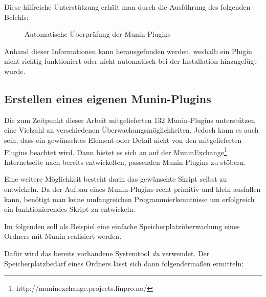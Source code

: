 Diese hilfreiche Unterstützung erhält man durch die Ausführung des folgenden Befehls:

\begin{figure}[ht]
	\centering
		\caption{Automatische Überprüfung der Munin-Plugins}
		\label{suggest}
\end{figure}

Anhand dieser Informationen kann herausgefunden werden, weshalb ein Plugin nicht richtig funktioniert oder nicht automatisch bei der Installation hinzugefügt wurde.
\newpage
\subsection{Erstellen eines eigenen Munin-Plugins}

Die zum Zeitpunkt dieser Arbeit mitgelieferten 132 Munin-Plugins unterstützen eine Vielzahl an verschiedenen Überwachungsmöglichkeiten.
Jedoch kann es auch sein, dass ein gewünschtes Element oder Detail nicht von den mitgelieferten Plugins beachtet wird.
Dann bietet es sich an auf der MuninExchange\footnote{http://muninexchange.projects.linpro.no/} Internetseite nach bereits entwickelten, passenden Munin-Plugins zu stöbern.

Eine weitere Möglichkeit besteht darin das gewünschte Skript selbst zu entwickeln.
Da der Aufbau eines Munin-Plugins recht primitiv und klein ausfallen kann, benötigt man keine umfangreichen Programmierkenntnisse um erfolgreich ein funktionierendes Skript zu entwickeln.

Im folgenden soll als Beispiel eine einfache Speicherplatzüberwachung eines Ordners mit Munin realisiert werden.

Dafür wird das bereits vorhandene Systemtool \textit{du} verwendet.
Der Speicherplatzbedarf eines Ordners lässt sich dann folgendermaßen ermitteln:


